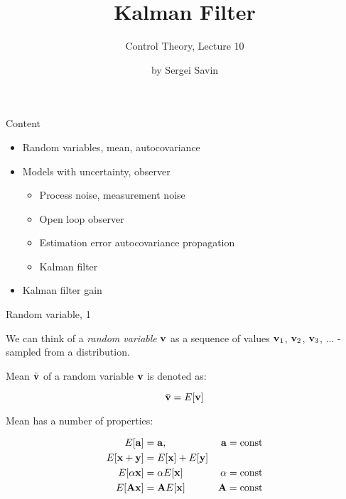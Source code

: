 \documentclass{beamer}
\title{Kalman Filter}
\subtitle{Control Theory, Lecture 10}
\author{by Sergei Savin}
\date{\mydate}
\begin{document}
\maketitle



\begin{frame}{Content}
\begin{itemize}
\item Random variables, mean, autocovariance
\item Models with uncertainty, observer
\begin{itemize}
	\item Process noise, measurement noise
	\item Open loop observer
	\item Estimation error autocovariance propagation
	\item Kalman filter
\end{itemize}
\item Kalman filter gain
\end{itemize}
\end{frame}




\begin{frame}{Random variable, 1}
\begin{flushleft}

We can think of a \emph{random variable} $\mathbf{v}$ as a sequence of values $\mathbf{v}_1$, $\mathbf{v}_2$, $\mathbf{v}_3$, ... - sampled from a distribution.

\bigskip

Mean $\bar{\mathbf{v}}$ of a random variable $\mathbf{v}$ is denoted as:

\begin{equation}
	\bar{\mathbf{v}} = E[\mathbf{v}]
\end{equation}

Mean has a number of properties:

\begin{align}
	E[\mathbf{a}] &= \mathbf{a}, & \mathbf{a}= \text{const} \\
	E[\mathbf{x}+\mathbf{y}] &= E[\mathbf{x}] + E[\mathbf{y}] &\\
	E[\alpha \mathbf{x}] &= \alpha  E[\mathbf{x}]  & \alpha = \text{const}\\
	E[\mathbf{A} \mathbf{x}] &= \mathbf{A}  E[\mathbf{x}] & \mathbf{A} = \text{const}
\end{align}


\end{flushleft}
\end{frame}
\end{document}
